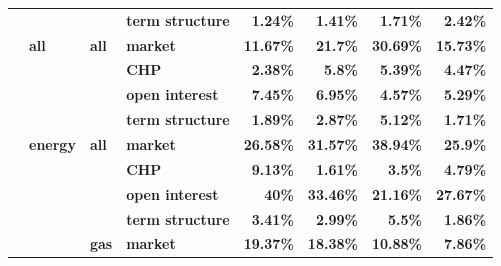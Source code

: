 \documentclass[
  authoryear,
  preprint,
  3p]{elsarticle}
\begin{document}
\begin{longtable}[t]{>{}l>{}l>{}l>{}l>{}r>{}r>{}r>{}r}
\textbf{} & \textbf{} & \textbf{} & \textbf{term structure} & \textcolor[HTML]{4285f4}{\textbf{1.24\%}} & \textcolor[HTML]{4285f4}{\textbf{1.41\%}} & \textcolor[HTML]{4285f4}{\textbf{1.71\%}} & \textcolor[HTML]{4285f4}{\textbf{2.42\%}}\\
\addlinespace
\textbf{} & \textbf{all} & \textbf{all} & \textbf{market} & \textcolor[HTML]{4285f4}{\textbf{11.67\%}} & \textcolor[HTML]{4285f4}{\textbf{21.7\%}} & \textcolor[HTML]{4285f4}{\textbf{30.69\%}} & \textcolor[HTML]{4285f4}{\textbf{15.73\%}}\\
\textbf{} & \textbf{} & \textbf{} & \textbf{CHP} & \textcolor[HTML]{4285f4}{\textbf{2.38\%}} & \textcolor[HTML]{4285f4}{\textbf{5.8\%}} & \textcolor[HTML]{4285f4}{\textbf{5.39\%}} & \textcolor[HTML]{4285f4}{\textbf{4.47\%}}\\
\textbf{} & \textbf{} & \textbf{} & \textbf{open interest} & \textcolor[HTML]{4285f4}{\textbf{7.45\%}} & \textcolor[HTML]{4285f4}{\textbf{6.95\%}} & \textcolor[HTML]{4285f4}{\textbf{4.57\%}} & \textcolor[HTML]{4285f4}{\textbf{5.29\%}}\\
\textbf{} & \textbf{} & \textbf{} & \textbf{term structure} & \textcolor[HTML]{4285f4}{\textbf{1.89\%}} & \textcolor[HTML]{4285f4}{\textbf{2.87\%}} & \textcolor[HTML]{4285f4}{\textbf{5.12\%}} & \textcolor[HTML]{4285f4}{\textbf{1.71\%}}\\
\textbf{} & \textbf{energy} & \textbf{all} & \textbf{market} & \textcolor[HTML]{4285f4}{\textbf{26.58\%}} & \textcolor[HTML]{4285f4}{\textbf{31.57\%}} & \textcolor[HTML]{4285f4}{\textbf{38.94\%}} & \textcolor[HTML]{4285f4}{\textbf{25.9\%}}\\
\addlinespace
\textbf{} & \textbf{} & \textbf{} & \textbf{CHP} & \textcolor[HTML]{4285f4}{\textbf{9.13\%}} & \textcolor[HTML]{4285f4}{\textbf{1.61\%}} & \textcolor[HTML]{4285f4}{\textbf{3.5\%}} & \textcolor[HTML]{4285f4}{\textbf{4.79\%}}\\
\textbf{} & \textbf{} & \textbf{} & \textbf{open interest} & \textcolor[HTML]{4285f4}{\textbf{40\%}} & \textcolor[HTML]{4285f4}{\textbf{33.46\%}} & \textcolor[HTML]{4285f4}{\textbf{21.16\%}} & \textcolor[HTML]{4285f4}{\textbf{27.67\%}}\\
\textbf{} & \textbf{} & \textbf{} & \textbf{term structure} & \textcolor[HTML]{4285f4}{\textbf{3.41\%}} & \textcolor[HTML]{4285f4}{\textbf{2.99\%}} & \textcolor[HTML]{4285f4}{\textbf{5.5\%}} & \textcolor[HTML]{4285f4}{\textbf{1.86\%}}\\
\textbf{} & \textbf{} & \textbf{gas} & \textbf{market} & \textcolor[HTML]{4285f4}{\textbf{19.37\%}} & \textcolor[HTML]{4285f4}{\textbf{18.38\%}} & \textcolor[HTML]{4285f4}{\textbf{10.88\%}} & \textcolor[HTML]{4285f4}{\textbf{7.86\%}}\\

\end{longtable}
\end{document}

